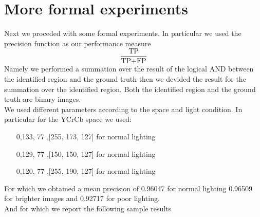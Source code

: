 \documentclass{report}
\begin{document}
\section{More formal experiments}
Next we proceded with some formal experiments.
In particular we used the precision function as
our performance measure 
\[
  \frac{\text{TP}}{\text{TP}+\text{FP}}
\]
Namely we performed a summation over the result of the logical AND between the identified region
and the ground truth then we devided the result for the summation over the identified region.
Both the identified region and the ground truth are binary images. \\
We used different parameters according to the space and light condition. In particular for the
YCrCb space we used:
\begin{itemize}
  \item [0,133, 77],[255, 173, 127] for normal lighting
  \item [0,129, 77],[150, 150, 127] for normal lighting
  \item [0,120, 77],[255, 190, 127] for normal lighting
\end{itemize}
For which we obtained a mean precision of 0.96047 for normal lighting 0.96509 for brighter images
and 0.92717 for poor lighting.\\
And for which we report the following sample results
\end{document}
